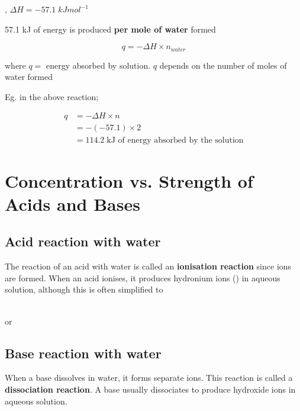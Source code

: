 		\begin{center}
			, $\Delta H = -57.1 \; kJmol^{-1}$
		\end{center}
	
		57.1 kJ of energy is produced \textbf{per mole of water} formed

		$$q = - \Delta H \times n_{water}$$

		where $q = $ energy absorbed by solution. $q$ depends on the number of moles of water formed

		Eg. in the above reaction;

		\begin{align*}
			q &= - \Delta H \times n \\
			  &= -(-57.1) \times 2 \\
			  &= 114.2 \; \si{\kilo\joule} \text{ of energy absorbed by the solution}
		\end{align*}

\section{Concentration vs. Strength of Acids and Bases} \label{19/02/2025}
	\subsection{Acid reaction with water}
	
		The reaction of an acid with water is called an \textbf{ionisation reaction} since ions are formed. When an acid ionises, it produces hydronium ions () in aqueous solution, although this is often simplified to 
		
		\begin{center}
			 \\
			or \\
		\end{center}

	\subsection{Base reaction with water}
		
		When a base dissolves in water, it forms separate ions. This reaction is called a \textbf{dissociation reaction}. A base usually dissociates to produce hydroxide ions in aqueous solution.

		\begin{center}
			 \\
		\end{center}

